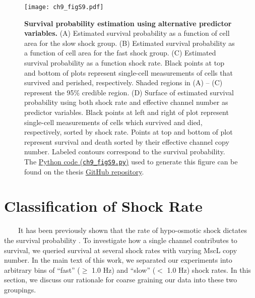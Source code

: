 \documentclass[12pt]{caltech_thesis}
\begin{document}
\hypertarget{fig:alternative_predictor_variables}{%
\begin{figure}
\centering
\texttt{[image: ch9\_figS9.pdf]}
\caption[{Survival probability estimation using alternative predictor
variables.}]{\textbf{Survival probability estimation using alternative
predictor variables.} (A) Estimated survival probability as a function
of cell area for the slow shock group. (B) Estimated survival
probability as a function of cell area for the fast shock group. (C)
Estimated survival probability as a function shock rate. Black points at
top and bottom of plots represent single-cell measurements of cells that
survived and perished, respectively. Shaded regions in (A) -- (C)
represent the 95\% credible region. (D) Surface of estimated survival
probability using both shock rate and effective channel number as
predictor variables. Black points at left and right of plot represent
single-cell measurements of cells which survived and died, respectively,
sorted by shock rate. Points at top and bottom of plot represent
survival and death sorted by their effective channel copy number.
Labeled contours correspond to the survival probability. The
\href{https://github.com/gchure/phd/blob/master/src/chapter_09/code/ch9_figS9.py}{Python
code (\texttt{ch9\_figS9.py})} used to generate this figure can be found
on the thesis \href{https://github.com/gchure/phd}{GitHub repository}.}
\label{fig:alternative_predictor_variables}
\end{figure}
}

\hypertarget{classification-of-shock-rate}{%
\section{Classification of Shock
Rate}\label{classification-of-shock-rate}}

~~~~It has been previously shown that the rate of hypo-osmotic shock
dictates the survival probability \autocite{bialecka-fornal2015}. To
investigate how a single channel contributes to survival, we queried
survival at several shock rates with varying MscL copy number. In the
main text of this work, we separated our experiments into arbitrary bins
of ``fast'' (\(\geq\) 1.0 Hz) and ``slow'' (\(<\) 1.0 Hz) shock rates.
In this section, we discuss our rationale for coarse graining our data
into these two groupings.
\end{document}
